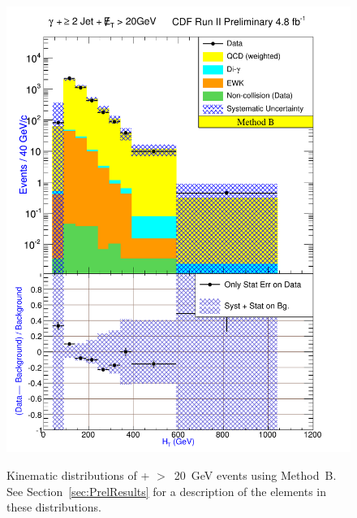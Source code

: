 \documentclass[12pt,twoside,letterpaper,doublespace]{article}
\begin{document}
\begin{figure}[h!]
\centering
\caption[Method B \phoonejet]{Kinematic distributions of \photwojet + \met$>$~20~GeV events using \mbox{Method B}. See Section~\ref{sec:PrelResults} for a description of the elements in these distributions.}
{\includegraphics[keepaspectratio=true, scale=\figScale]{G30JetsMet20_MtdB_plot2_Ht.pdf}}

\end{figure}
\end{document}
